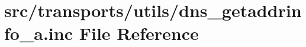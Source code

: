 \hypertarget{dns__getaddrinfo__a_8inc}{}\section{src/transports/utils/dns\+\_\+getaddrinfo\+\_\+a.inc File Reference}
\label{dns__getaddrinfo__a_8inc}
